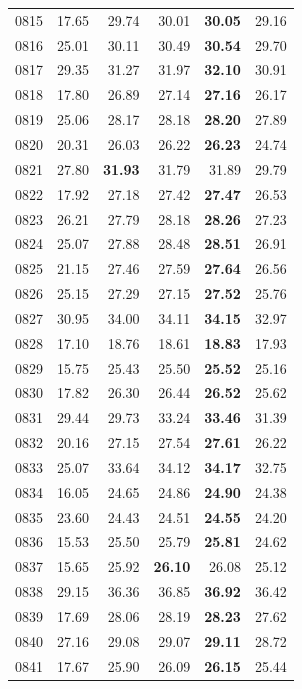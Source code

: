 \documentclass[12pt,a4paper,oneside]{NITR}
\begin{document}
{\begin{longtable}{@{}lrrrrr@{}}
0815 & 17.65 & 29.74 & 30.01 & \textbf{30.05} & 29.16 \\
0816 & 25.01 & 30.11 & 30.49 & \textbf{30.54} & 29.70 \\
0817 & 29.35 & 31.27 & 31.97 & \textbf{32.10} & 30.91 \\
0818 & 17.80 & 26.89 & 27.14 & \textbf{27.16} & 26.17 \\
0819 & 25.06 & 28.17 & 28.18 & \textbf{28.20} & 27.89 \\
0820 & 20.31 & 26.03 & 26.22 & \textbf{26.23} & 24.74 \\
0821 & 27.80 & \textbf{31.93} & 31.79 & 31.89 & 29.79 \\
0822 & 17.92 & 27.18 & 27.42 & \textbf{27.47} & 26.53 \\
0823 & 26.21 & 27.79 & 28.18 & \textbf{28.26} & 27.23 \\
0824 & 25.07 & 27.88 & 28.48 & \textbf{28.51} & 26.91 \\
0825 & 21.15 & 27.46 & 27.59 & \textbf{27.64} & 26.56 \\
0826 & 25.15 & 27.29 & 27.15 & \textbf{27.52} & 25.76 \\
0827 & 30.95 & 34.00 & 34.11 & \textbf{34.15} & 32.97 \\
0828 & 17.10 & 18.76 & 18.61 & \textbf{18.83} & 17.93 \\
0829 & 15.75 & 25.43 & 25.50 & \textbf{25.52} & 25.16 \\
0830 & 17.82 & 26.30 & 26.44 & \textbf{26.52} & 25.62 \\
0831 & 29.44 & 29.73 & 33.24 & \textbf{33.46} & 31.39 \\
0832 & 20.16 & 27.15 & 27.54 & \textbf{27.61} & 26.22 \\
0833 & 25.07 & 33.64 & 34.12 & \textbf{34.17} & 32.75 \\
0834 & 16.05 & 24.65 & 24.86 & \textbf{24.90} & 24.38 \\
0835 & 23.60 & 24.43 & 24.51 & \textbf{24.55} & 24.20 \\
0836 & 15.53 & 25.50 & 25.79 & \textbf{25.81} & 24.62 \\
0837 & 15.65 & 25.92 & \textbf{26.10} & 26.08 & 25.12 \\
0838 & 29.15 & 36.36 & 36.85 & \textbf{36.92} & 36.42 \\
0839 & 17.69 & 28.06 & 28.19 & \textbf{28.23} & 27.62 \\
0840 & 27.16 & 29.08 & 29.07 & \textbf{29.11} & 28.72 \\
0841 & 17.67 & 25.90 & 26.09 & \textbf{26.15} & 25.44 \\

\end{longtable}}
\end{document}
